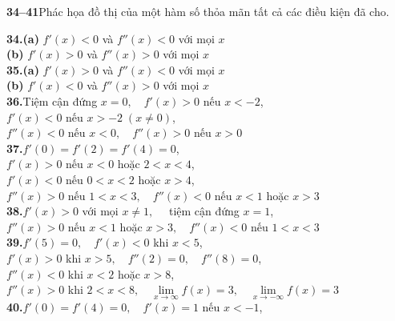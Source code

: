 \hfill
\begin{minipage}[t]{0.485\textwidth}
    {\color{stewartcyan}\textbf{34--41}}\enspace Phác họa đồ thị của một hàm số thỏa mãn tất cả các điều kiện đã cho.
    \vspace{3pt}

    \textbf{34.}\enspace \textbf{(a)} $f'(x) < 0$ và $f''(x) < 0$ với mọi $x$\\
    \textbf{(b)} $f'(x) > 0$ và $f''(x) > 0$ với mọi $x$\\[3pt]
    \textbf{35.}\enspace \textbf{(a)} $f'(x) > 0$ và $f''(x) < 0$ với mọi $x$\\
    \textbf{(b)} $f'(x) < 0$ và $f''(x) > 0$ với mọi $x$\\[3pt]
    \textbf{36.}\enspace Tiệm cận đứng $x = 0, \quad f'(x) > 0$ nếu $x < -2$,\\
    $f'(x) < 0$ nếu $x > -2 \; (x \neq 0)$,\\
    $f''(x) < 0$ nếu $x < 0, \quad f''(x) > 0$ nếu $x > 0$\\[3pt]
    \textbf{37.}\enspace $f'(0) = f'(2) = f'(4) = 0$,\\
    $f'(x) > 0$ nếu $x < 0$ hoặc $2 < x < 4$,\\
    $f'(x) < 0$ nếu $0 < x < 2$ hoặc $x > 4$,\\
    $f''(x) > 0$ nếu $1 < x < 3, \quad f''(x) < 0$ nếu $x < 1$ hoặc $x > 3$\\[3pt]
    \textbf{38.}\enspace $f'(x) > 0$ với mọi $x \neq 1, \quad$ tiệm cận đứng $x = 1$,\\
    $f''(x) > 0$ nếu $x < 1$ hoặc $x > 3, \quad f''(x) < 0$ nếu $1 < x < 3$\\[3pt]
    \textbf{39.}\enspace $f'(5) = 0, \quad f'(x) < 0$ khi $x < 5$,\\
    $f'(x) > 0$ khi $x > 5, \quad f''(2) = 0, \quad f''(8) = 0$,\\
    $f''(x) < 0$ khi $x < 2$ hoặc $x > 8$,\\
    $f''(x) > 0$ khi $2 < x < 8, \quad \lim\limits_{x \to \infty} f(x) = 3, \quad \lim\limits_{x \to -\infty} f(x) = 3$\\[3pt]
    \textbf{40.}\enspace $f'(0) = f'(4) = 0, \quad f'(x) = 1$ nếu $x < -1$,\\

\end{minipage}

